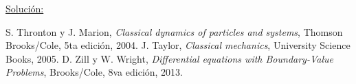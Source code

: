 \documentclass[a4paper,10pt]{article}
\begin{document}
\vspace{.3cm}

\underline{Solución:}

\vspace{.3cm}

\begin{thebibliography}{10}
 S. Thronton y J. Marion, \textit{Classical dynamics of particles and systems}, Thomson Brooks/Cole,
 5ta edición, 2004.
 J. Taylor, \textit{Classical mechanics}, University Science Books, 2005.
 D. Zill y W. Wright, \textit{Differential equations with Boundary-Value Problems}, Brooks/Cole,
 8va edición, 2013.
\end{thebibliography}
\end{document}
